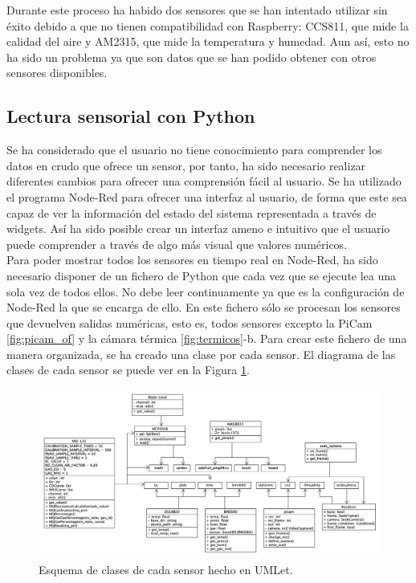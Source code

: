 Durante este proceso ha habido dos sensores que se han intentado utilizar sin éxito debido a que no tienen compatibilidad con Raspberry: CCS811, que mide la calidad del aire y AM2315, que mide la temperatura y humedad. Aun así, esto no ha sido un problema ya que son datos que se han podido obtener con otros sensores disponibles.\\

\subsection{Lectura sensorial con Python}
\label{sec:ficheropython}
Se ha considerado que el usuario no tiene conocimiento para comprender los datos en crudo que ofrece un sensor, por tanto, ha sido necesario realizar diferentes cambios para ofrecer una comprensión fácil al usuario. Se ha utilizado el programa Node-Red para ofrecer una interfaz al usuario, de forma que este sea capaz de ver la información del estado del sistema representada a través de widgets. Así ha sido posible crear un interfaz ameno e intuitivo que el usuario puede comprender a través de algo más visual que valores numéricos.\\

Para poder mostrar todos los sensores en tiempo real en Node-Red, ha sido necesario disponer de un fichero de Python que  cada vez que se ejecute lea una sola vez de todos ellos. No debe leer continuamente ya que es la configuración de Node-Red la que se encarga de ello. En este fichero sólo se procesan los sensores que devuelven salidas numéricas, esto es, todos sensores excepto la PiCam \ref{fig:picam_of} y la cámara térmica \ref{fig:termicos}-b. Para crear este fichero de una manera organizada, se ha creado una clase por cada sensor. El diagrama de las clases de cada sensor se puede ver en la Figura \ref{fig:umlet}. \\
\begin{figure} [h!]
  \begin{center}
    \includegraphics[width=16cm]{figs/umlet}
  \end{center}
  \caption{Esquema de clases de cada sensor hecho en UMLet.}
  \label{fig:umlet}
\end{figure}

